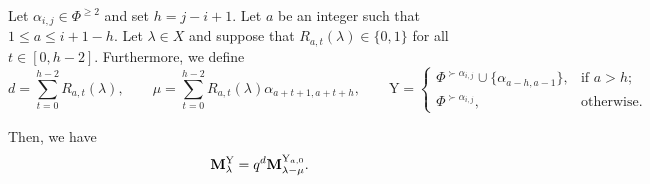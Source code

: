 \begin{lemma}\label{lem: fifth string lemma} 
Let $\alpha_{i,j} \in \Phi^{\geq 2}$ and set $h = j-i+1$.
Let $a$ be an integer such that $1\leq a \leq i+1-h$.
Let $\lambda \in X$ and suppose that $R_{a,t}(\lambda)\in \{0,1\}$ for all $t\in [0,h-2]$. 
Furthermore, we define 
\begin{equation}
    d=\sum_{t=0}^{h-2}R_{a,t}(\lambda), \qquad \mu = \sum_{t=0}^{h-2}R_{a,t}(\lambda)\alpha_{a+t+1,a+t+h}, \qquad \mathrm{Y} = \begin{cases}
        \Phi^{\succ \alpha_{i,j}}\cup \{\alpha_{a-h,a-1}\},&\text{if } a>h;\\%
        \Phi^{\succ \alpha_{i,j}},&\text{otherwise}.
    \end{cases}
\end{equation}

Then, we have
\begin{equation}
        \mathbf{M}_{\lambda}^{\mathrm{Y}} = q^{d}\mathbf{M}_{\lambda - \mu}^{\mathrm{Y}_{a,0}}.
\end{equation}
\end{lemma}


